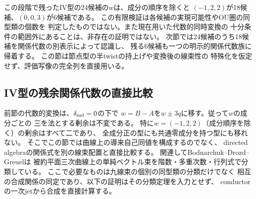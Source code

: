 \begin{remark}
この段階で残ったIV型の24候補の$w$は、成分の順序を除くと
$(-1,2,2)$が18候補、$(0,0,3)$が6候補である。
この有限検証は各候補の実現可能性やOU圏の同型類の個数を
判定したものではない。また現在用いた代数的同時変換の
十分条件の範囲外にあることは、非存在の証明ではない。
次節では24候補のうち18候補を関係代数の別表示によって認識し、
残る6候補も一つの明示的関係代数族に帰着する。
この節は節点型の半twistの持上げや変換後の線束性の
特殊化を仮定せず、評価写像の完全列を直接用いる。
\end{remark}


\subsection{IV型の残余関係代数の直接比較}
\label{subsec:ou-iv-relations}
前節の代数的変換は、$\delta_{\rm md}=0$の下で
$w=B-A$を$w\pm3q$に移す。従って$w$の成分ごとの
三を法とする剰余は不変である。
特に$w=(-1,2,2)$（成分順序を除く）の剰余はすべて二であり、
全成分正の型にも共通零成分を持つ型にも移れない。
そこでこの節では曲線上の導来自己同値を構成するのでなく、
directed algebraの関係式を別の線束配置と直接比較する。
関連してBodnarchuk--Drozd--Greuel\cite[Theorem~1.2]{BodnarchukDrozdGreuel2012}は
被約平面三次曲線上の単純ベクトル束を階数・多重次数・行列式で分類している。
ここで必要なものは九線束の個別の同型類の分類だけでなく
相互の合成関係の同定であり、以下の証明はその分類定理を入力とせず、
conductorの一次jetから合成を直接計算する。

